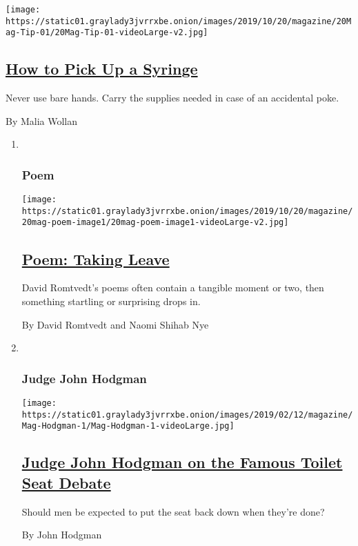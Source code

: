\begin{enumerate}
  \texttt{[image: https://static01.graylady3jvrrxbe.onion/images/2019/10/20/magazine/20Mag-Tip-01/20Mag-Tip-01-videoLarge-v2.jpg]}

  \hypertarget{how-to-pick-up-a-syringe}{%
  \subsection{\texorpdfstring{\href{/2019/10/17/magazine/how-to-pick-up-a-syringe.html}{How
  to Pick Up a
  Syringe}}{How to Pick Up a Syringe}}\label{how-to-pick-up-a-syringe}}

  Never use bare hands. Carry the supplies needed in case of an
  accidental poke.

  By Malia Wollan
\end{enumerate}

\begin{enumerate}
\def\labelenumi{\arabic{enumi}.}
\item ~
  \hypertarget{poem}{%
  \subsubsection{Poem}\label{poem}}

  \texttt{[image: https://static01.graylady3jvrrxbe.onion/images/2019/10/20/magazine/20mag-poem-image1/20mag-poem-image1-videoLarge-v2.jpg]}

  \hypertarget{poem-taking-leave}{%
  \subsection{\texorpdfstring{\href{/2019/10/17/magazine/poem-taking-leave.html}{Poem:
  Taking Leave}}{Poem: Taking Leave}}\label{poem-taking-leave}}

  David Romtvedt's poems often contain a tangible moment or two, then
  something startling or surprising drops in.

  By David Romtvedt and Naomi Shihab Nye
\item ~
  \hypertarget{judge-john-hodgman}{%
  \subsubsection{Judge John Hodgman}\label{judge-john-hodgman}}

  \texttt{[image: https://static01.graylady3jvrrxbe.onion/images/2019/02/12/magazine/Mag-Hodgman-1/Mag-Hodgman-1-videoLarge.jpg]}

  \hypertarget{judge-john-hodgman-on-the-famous-toilet-seat-debate}{%
  \subsection{\texorpdfstring{\href{/2019/10/17/magazine/judge-john-hodgman-on-the-famous-toilet-seat-debate.html}{Judge
  John Hodgman on the Famous Toilet Seat
  Debate}}{Judge John Hodgman on the Famous Toilet Seat Debate}}\label{judge-john-hodgman-on-the-famous-toilet-seat-debate}}

  Should men be expected to put the seat back down when they're done?

  By John Hodgman
\end{enumerate}

